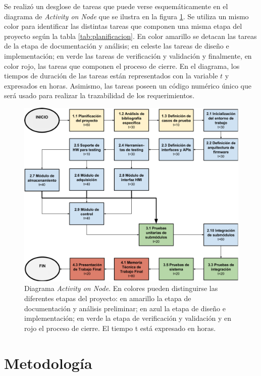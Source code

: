 Se realizó un desglose de tareas que puede verse esquemáticamente en el diagrama de \textit{Activity on Node} que se ilustra en la figura \ref{fig:AoN}. Se utiliza un mismo color para identificar las distintas tareas que componen una misma etapa del proyecto según la tabla \ref{tab:planificacion}. En color amarillo se detacan las tareas de la etapa de documentación y análisis; en celeste las tareas de diseño e implementación; en verde las tareas de verificación y validación y finalmente, en color rojo, las tareas que componen el proceso de cierre. En el diagrama, los tiempos de duración de las tareas están representados con la variable $t$ y expresados en horas. Asimismo, las tareas poseen un código numérico único que será usado para realizar la trazabilidad de los requerimientos.

\begin{figure}[ht]
	\centering
	\includegraphics[width=\textwidth]{./Figures/AoN.pdf}
	\caption[Diagrama \textit{Activity on Node}.]{Diagrama \textit{Activity on Node}.  En colores pueden distinguirse las diferentes etapas del proyecto: en amarillo la etapa de documentación y análisis preliminar; en azul la etapa de diseño e implementación; en verde la etapa de verificación y validación y en rojo el proceso de cierre. El tiempo t está expresado en horas.}
	\label{fig:AoN}
\end{figure}

\clearpage
\section{Metodología}

